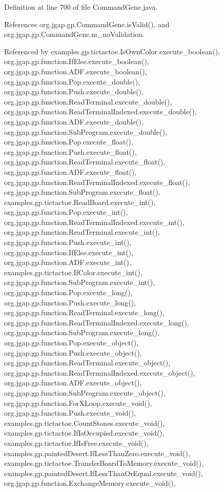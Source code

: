 Definition at line 700 of file Command\-Gene.\-java.



References org.\-jgap.\-gp.\-Command\-Gene.\-is\-Valid(), and org.\-jgap.\-gp.\-Command\-Gene.\-m\-\_\-no\-Validation.



Referenced by examples.\-gp.\-tictactoe.\-Is\-Own\-Color.\-execute\-\_\-boolean(), org.\-jgap.\-gp.\-function.\-If\-Else.\-execute\-\_\-boolean(), org.\-jgap.\-gp.\-function.\-A\-D\-F.\-execute\-\_\-boolean(), org.\-jgap.\-gp.\-function.\-Pop.\-execute\-\_\-double(), org.\-jgap.\-gp.\-function.\-Push.\-execute\-\_\-double(), org.\-jgap.\-gp.\-function.\-Read\-Terminal.\-execute\-\_\-double(), org.\-jgap.\-gp.\-function.\-Read\-Terminal\-Indexed.\-execute\-\_\-double(), org.\-jgap.\-gp.\-function.\-A\-D\-F.\-execute\-\_\-double(), org.\-jgap.\-gp.\-function.\-Sub\-Program.\-execute\-\_\-double(), org.\-jgap.\-gp.\-function.\-Pop.\-execute\-\_\-float(), org.\-jgap.\-gp.\-function.\-Push.\-execute\-\_\-float(), org.\-jgap.\-gp.\-function.\-Read\-Terminal.\-execute\-\_\-float(), org.\-jgap.\-gp.\-function.\-A\-D\-F.\-execute\-\_\-float(), org.\-jgap.\-gp.\-function.\-Read\-Terminal\-Indexed.\-execute\-\_\-float(), org.\-jgap.\-gp.\-function.\-Sub\-Program.\-execute\-\_\-float(), examples.\-gp.\-tictactoe.\-Read\-Board.\-execute\-\_\-int(), org.\-jgap.\-gp.\-function.\-Pop.\-execute\-\_\-int(), org.\-jgap.\-gp.\-function.\-Read\-Terminal\-Indexed.\-execute\-\_\-int(), org.\-jgap.\-gp.\-function.\-Read\-Terminal.\-execute\-\_\-int(), org.\-jgap.\-gp.\-function.\-Push.\-execute\-\_\-int(), org.\-jgap.\-gp.\-function.\-If\-Else.\-execute\-\_\-int(), org.\-jgap.\-gp.\-function.\-A\-D\-F.\-execute\-\_\-int(), examples.\-gp.\-tictactoe.\-If\-Color.\-execute\-\_\-int(), org.\-jgap.\-gp.\-function.\-Sub\-Program.\-execute\-\_\-int(), org.\-jgap.\-gp.\-function.\-Pop.\-execute\-\_\-long(), org.\-jgap.\-gp.\-function.\-Push.\-execute\-\_\-long(), org.\-jgap.\-gp.\-function.\-Read\-Terminal.\-execute\-\_\-long(), org.\-jgap.\-gp.\-function.\-Read\-Terminal\-Indexed.\-execute\-\_\-long(), org.\-jgap.\-gp.\-function.\-Sub\-Program.\-execute\-\_\-long(), org.\-jgap.\-gp.\-function.\-Pop.\-execute\-\_\-object(), org.\-jgap.\-gp.\-function.\-Push.\-execute\-\_\-object(), org.\-jgap.\-gp.\-function.\-Read\-Terminal.\-execute\-\_\-object(), org.\-jgap.\-gp.\-function.\-Read\-Terminal\-Indexed.\-execute\-\_\-object(), org.\-jgap.\-gp.\-function.\-A\-D\-F.\-execute\-\_\-object(), org.\-jgap.\-gp.\-function.\-Sub\-Program.\-execute\-\_\-object(), org.\-jgap.\-gp.\-function.\-For\-X\-Loop.\-execute\-\_\-void(), org.\-jgap.\-gp.\-function.\-Push.\-execute\-\_\-void(), examples.\-gp.\-tictactoe.\-Count\-Stones.\-execute\-\_\-void(), examples.\-gp.\-tictactoe.\-If\-Is\-Occupied.\-execute\-\_\-void(), examples.\-gp.\-tictactoe.\-If\-Is\-Free.\-execute\-\_\-void(), examples.\-gp.\-painted\-Desert.\-If\-Less\-Than\-Zero.\-execute\-\_\-void(), examples.\-gp.\-tictactoe.\-Transfer\-Board\-To\-Memory.\-execute\-\_\-void(), examples.\-gp.\-painted\-Desert.\-If\-Less\-Than\-Or\-Equal.\-execute\-\_\-void(), org.\-jgap.\-gp.\-function.\-Exchange\-Memory.\-execute\-\_\-void(), 